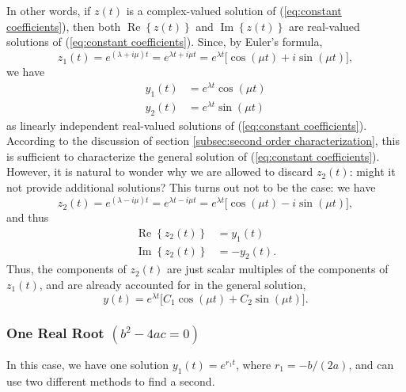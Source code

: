 \documentclass{myart}
\newcommand{\eq}[1]{(\ref{eq:#1})}
\DeclareMathOperator{\OpRe}{Re}
\DeclareMathOperator{\OpIm}{Im}
\renewcommand{\Re}[1]{\OpRe\left\{#1\right\}}
\renewcommand{\Im}[1]{\OpIm\left\{#1\right\}}
\begin{document}
In other words, if $z(t)$ is a complex-valued solution of \eq{constant coefficients}, then both $\Re{z(t)}$ and $\Im{z(t)}$ are real-valued solutions of \eq{constant coefficients}. Since, by Euler's formula,
\begin{equation*}
z_1(t) = e^{(\lambda + i\mu)t} = e^{\lambda t + i\mu t} = e^{\lambda t}\big[\cos(\mu t) + i \sin(\mu t)\big],
\end{equation*}
we have
\begin{align*}
y_1(t) &= e^{\lambda t} \cos(\mu t) \\
y_2(t) &= e^{\lambda t} \sin(\mu t)
\end{align*}
as linearly independent real-valued solutions of \eq{constant coefficients}. According to the discussion of section \ref{subsec:second order characterization}, this is sufficient to characterize the general solution of \eq{constant coefficients}. However, it is natural to wonder why we are allowed to discard $z_2(t)$: might it not provide additional solutions? This turns out not to be the case: we have
\begin{equation*}
z_2(t) = e^{(\lambda - i\mu)t} = e^{\lambda t - i\mu t} = e^{\lambda t} \big[\cos(\mu t) - i \sin(\mu t)\big],
\end{equation*}
and thus
\begin{align*}
\Re{z_2(t)} &= y_1(t) \\
\Im{z_2(t)} &= -y_2(t).
\end{align*}
Thus, the components of $z_2(t)$ are just scalar multiples of the components of $z_1(t)$, and are already accounted for in the general solution,
\begin{equation*}
y(t) = e^{\lambda t} \big[C_1 \cos(\mu t) + C_2 \sin(\mu t)\big].
\end{equation*}

\subsubsection{One Real Root \texorpdfstring{$(b^2 - 4ac = 0)$}{(b^2 - 4ac = 0)}} \label{subsubsec:constant coefficients equal roots}

In this case, we have one solution $y_1(t) = e^{r_1t}$, where $r_1 = -b/(2a)$, and can use two different methods to find a second.
\end{document}
